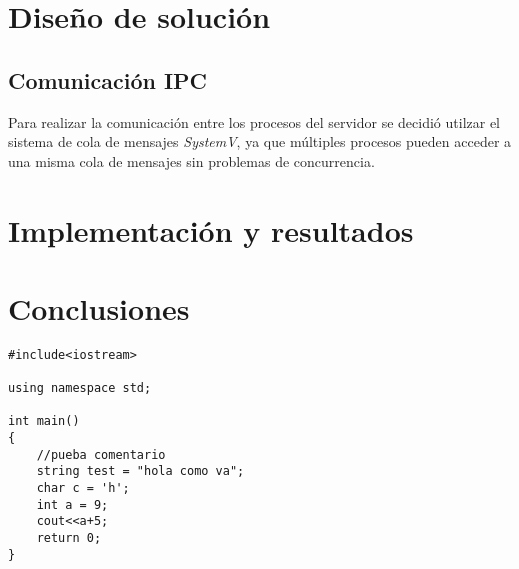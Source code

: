 \documentclass[12pt,a4paper]{article}
\begin{document}
\section{Diseño de solución}
\label{solucion}

\subsection{Comunicación IPC}
\label{ipc}
Para realizar la comunicación entre los procesos del servidor se decidió utilzar
el sistema de cola de mensajes \emph{SystemV}, ya que múltiples procesos pueden
acceder a una misma cola de mensajes sin problemas de concurrencia.

\section{Implementación y resultados}

\section{Conclusiones}

\begin{lstlisting}[caption={Prueba Ce language.}, language=Ce]
#include<iostream>

using namespace std;

int main()
{
	//pueba comentario
	string test = "hola como va";
	char c = 'h';
	int a = 9;
	cout<<a+5;
	return 0;
}
\end{lstlisting}
\end{document}
